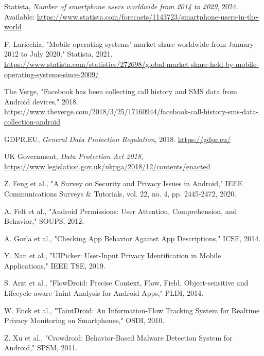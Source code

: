 \documentclass[a4paper,12pt]{report}
\begin{document}
\begin{thebibliography}{99}
     Statista, \textit{Number of smartphone users worldwide from 2014 to 2029}, 2024. Available: \url{https://www.statista.com/forecasts/1143723/smartphone-users-in-the-world}

     F. Laricchia, "Mobile operating systems’ market share worldwide from January 2012 to July 2020," Statista, 2021. \url{https://www.statista.com/statistics/272698/global-market-share-held-by-mobile-operating-systems-since-2009/}

     The Verge, "Facebook has been collecting call history and SMS data from Android devices," 2018. \url{https://www.theverge.com/2018/3/25/17160944/facebook-call-history-sms-data-collection-android}

     GDPR.EU, \textit{General Data Protection Regulation}, 2018. \url{https://gdpr.eu/}

     UK Government, \textit{Data Protection Act 2018}, \url{https://www.legislation.gov.uk/ukpga/2018/12/contents/enacted}

     Z. Feng et al., "A Survey on Security and Privacy Issues in Android," IEEE Communications Surveys & Tutorials, vol. 22, no. 4, pp. 2445-2472, 2020.

     A. Felt et al., "Android Permissions: User Attention, Comprehension, and Behavior," SOUPS, 2012.

     A. Gorla et al., "Checking App Behavior Against App Descriptions," ICSE, 2014.

     Y. Nan et al., "UIPicker: User-Input Privacy Identification in Mobile Applications," IEEE TSE, 2019.

     S. Arzt et al., "FlowDroid: Precise Context, Flow, Field, Object-sensitive and Lifecycle-aware Taint Analysis for Android Apps," PLDI, 2014.

     W. Enck et al., "TaintDroid: An Information-Flow Tracking System for Realtime Privacy Monitoring on Smartphones," OSDI, 2010.

     Z. Xu et al., "Crowdroid: Behavior-Based Malware Detection System for Android," SPSM, 2011.


\end{thebibliography}
\end{document}
